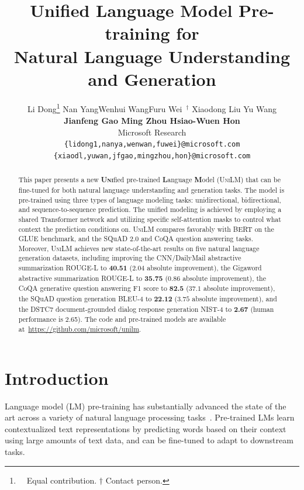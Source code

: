 \documentclass{article}
\title{Unified Language Model Pre-training for \\ Natural Language Understanding and Generation}
\author{{Li Dong\thanks{~~Equal contribution. $\dagger$ Contact person.} \quad Nan Yang\footnotemark[1] \quad Wenhui Wang\footnotemark[1] \quad Furu Wei\footnotemark[1] \ $^\dagger$ \quad Xiaodong Liu \quad Yu Wang} \\ {\bf Jianfeng Gao \quad Ming Zhou \quad Hsiao-Wuen Hon} \\
Microsoft Research \\
{\tt \{lidong1,nanya,wenwan,fuwei\}@microsoft.com} \\
{\tt \{xiaodl,yuwan,jfgao,mingzhou,hon\}@microsoft.com}}
\newcommand\ours{\textsc{UniLM}}
\begin{document}
\maketitle

\begin{abstract}
This paper presents a new \textsc{\textbf{Uni}}fied pre-trained \textbf{L}anguage \textbf{M}odel (\ours{}) that can be fine-tuned for both natural language understanding and generation tasks. The model is pre-trained using three types of language modeling tasks: unidirectional, bidirectional, and sequence-to-sequence prediction. The unified modeling is achieved by employing a shared Transformer network and utilizing specific self-attention masks to control what context the prediction conditions on.
\ours{} compares favorably with BERT on the GLUE benchmark, and the SQuAD 2.0 and CoQA question answering tasks. 
Moreover, \ours{} achieves new state-of-the-art results on five natural language generation datasets, including improving the CNN/DailyMail abstractive summarization ROUGE-L to \textbf{40.51} ($2.04$ absolute improvement), the Gigaword abstractive summarization ROUGE-L to \textbf{35.75} ($0.86$ absolute improvement), the CoQA generative question answering F1 score to \textbf{82.5} ($37.1$ absolute improvement), the SQuAD question generation BLEU-4 to \textbf{22.12} ($3.75$ absolute improvement), and the DSTC7 document-grounded dialog response generation NIST-4 to \textbf{2.67} (human performance is 2.65). The code and pre-trained models are available at~\url{https://github.com/microsoft/unilm}.
\end{abstract}

\section{Introduction}

Language model (LM) pre-training has substantially advanced the state of the art across a variety of natural language processing tasks~\cite{semi_seq,elmo,ulmfit,gpt,bert,clozepretrain19}.
Pre-trained LMs learn contextualized text representations by predicting words based on their context using large amounts of text data, 
and can be fine-tuned
to adapt to downstream tasks.
\end{document}
